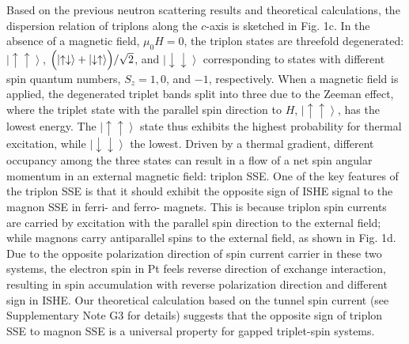 \documentclass{nature}
\begin{document}
Based on the previous neutron scattering results\cite{Regnault:1996bv} and theoretical calculations\cite{Bonner:1982bs},
the dispersion relation of triplons along the $c$-axis is sketched in Fig. 1c.
In the absence of a magnetic field, $\mu_0 H = 0$, the triplon states are threefold degenerated:
$\left|\uparrow \uparrow \right\rangle$, $\Bigl(\left|\uparrow\downarrow\right\rangle+\left|\downarrow\uparrow\right\rangle\Bigr)/\sqrt{2}$, and $\left|\downarrow \downarrow \right\rangle$ corresponding to states with different spin quantum numbers, $S_z = 1, 0$, and $-1$, respectively.
 When a magnetic field is applied, the degenerated triplet bands split into three due to the Zeeman effect, where the triplet state with the
  parallel spin direction to $H$, $\left|\uparrow \uparrow \right\rangle$, has the lowest energy\cite{Brill:1994ki,Regnault:1996bv,Fujita:1995ha}.
   The $\left|\uparrow \uparrow \right\rangle$ state thus exhibits the highest probability for thermal excitation, while $\left|\downarrow \downarrow \right\rangle$ the lowest.
Driven by a thermal gradient, different occupancy among the three states can result in a flow of a net spin angular momentum in an external magnetic field: triplon SSE. 
One of the key features of the triplon SSE is that it should exhibit the opposite sign of ISHE signal to the magnon SSE in ferri- and ferro- magnets.
This is because triplon spin currents are carried by excitation with the parallel spin direction to the external field; while magnons carry antiparallel spins to the external field, as shown in Fig. 1d.
Due to the opposite polarization direction of spin current carrier in these two systems, the electron spin in Pt feels reverse direction of exchange interaction, resulting in spin accumulation with reverse polarization direction and different sign in ISHE. 
Our theoretical calculation based on the tunnel spin current (see Supplementary Note G3 for details) suggests that the opposite sign of triplon SSE to magnon SSE is a universal property for gapped triplet-spin systems.


\par 
\end{document}
